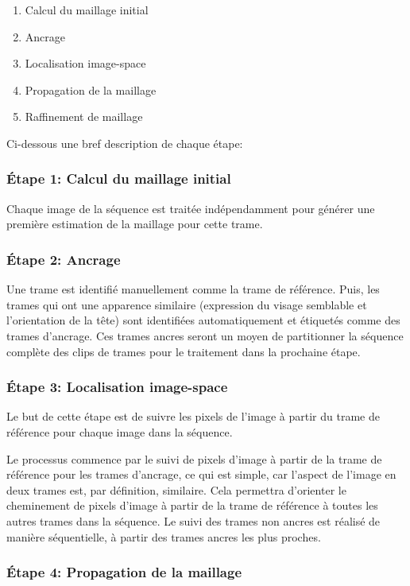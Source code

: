 \documentclass[a4paper,12pt]{article}
\begin{document}
\begin{enumerate}
\item Calcul du maillage initial
\item Ancrage
\item Localisation image-space
\item Propagation de la maillage
\item Raffinement de maillage
\end{enumerate}

Ci-dessous une bref description de chaque étape:

\subsubsection*{Étape 1: Calcul du maillage initial}
Chaque image de la séquence est traitée indépendamment pour générer
une première estimation de la maillage pour cette trame. 

\subsubsection*{Étape 2: Ancrage}
Une trame est identifié manuellement comme la trame de référence. Puis,
les trames qui ont une apparence similaire (expression du visage
semblable et l'orientation de la tête) sont identifiées
automatiquement et étiquetés comme des trames d'ancrage. Ces trames
ancres seront un moyen de partitionner la séquence complète des clips
de trames pour le traitement dans la prochaine étape. 

\subsubsection*{Étape 3: Localisation image-space}
Le but de cette étape est de suivre les pixels de l'image à partir du
trame de référence pour chaque image dans la séquence.  

Le processus commence par le suivi de pixels d'image à partir de la
trame de référence pour les trames d'ancrage, ce qui est simple, car
l'aspect de l'image en deux trames est, par définition,
similaire. Cela permettra d'orienter le cheminement de pixels d'image
à partir de la trame de référence à toutes les autres trames dans la
séquence.  
Le suivi des trames non ancres est réalisé de manière séquentielle, à
partir des trames ancres les plus proches.

\subsubsection*{Étape 4: Propagation de la maillage}
\end{document}
